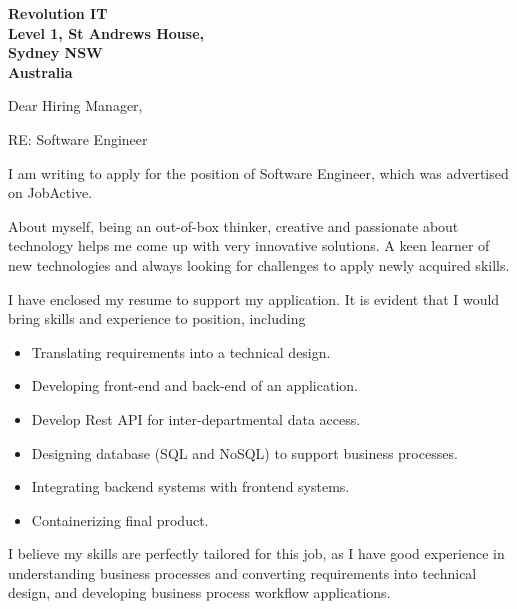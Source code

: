 \documentclass{letter}
\begin{document}
\begin{letter}{\bf Revolution IT\\Level 1, St Andrews House,\\Sydney NSW\\Australia}

\opening{Dear Hiring Manager,\\}

RE: Software Engineer


I am writing to apply for the position of Software Engineer, which was advertised on JobActive.


About myself, being an out-of-box thinker, creative and passionate about technology helps me come up with very innovative solutions. A keen learner of new technologies and always looking for challenges to apply newly acquired skills.

I have enclosed my resume to support my application. It is evident that I would bring skills and experience to position, including\\
\begin{itemize}
\item Translating requirements into a technical design.
\item Developing front-end and back-end of an application.
\item Develop Rest API for inter-departmental data access.
\item Designing database (SQL and NoSQL) to support business processes.
\item Integrating backend systems with frontend systems.
\item Containerizing final product.
\end{itemize}

I believe my skills are perfectly tailored for this job, as I have good experience in understanding business processes and converting requirements into technical design, and developing business process workflow applications.


\end{letter}
\end{document}
